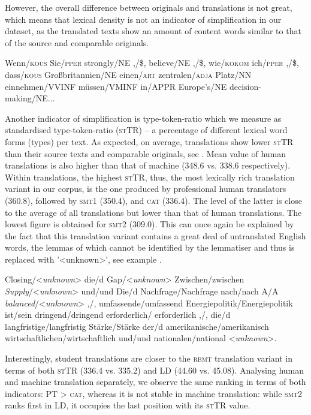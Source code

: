 \documentclass[output=paper]{LSP/langsci}
\begin{document}
However, the overall difference between originals and translations is not great, which means that lexical density is not an indicator of simplification in our dataset, as the translated texts show an amount of content words similar to that of the source and comparable originals.

\ea \label{ex:4:1}
Wenn/\textsc{kous} Sie/\textsc{pper} strongly/NE ,/\$, believe/NE ,/\$, wie/\textsc{kokom} ich/\textsc{pper} ,/\$, dass/\textsc{kous} Großbritannien/NE einen/\textsc{art} zentralen/\textsc{adja} Platz/NN einnehmen/VVINF müssen/VMINF in/APPR Europe’s/NE decision-making/NE...
\z

Another indicator of simplification is type-token-ratio which we measure as standardised type-token-ratio (\textsc{st}TR) – a percentage of different lexical word forms (types) per text.  As expected, on average, translations show lower \textsc{st}TR than their source texts and comparable originals, see . Mean value of human translations is also higher than that of machine (348.6 vs. 338.6 respectively). Within translations, the highest \textsc{st}TR, thus, the most lexically rich translation variant in our corpus, is the one produced by professional human translators (360.8), followed by \textsc{smt}1 (350.4), and \textsc{cat} (336.4).  The level of the latter is close to the average of all translations but lower than that of human translations. The lowest figure is obtained for \textsc{smt}2 (309.0). This can once again be explained by the fact that this translation variant contains a great deal of untranslated English words, the lemmas of which cannot be identified by the lemmatiser and thus is replaced with '<unknown>’, see example .

\ea \label{ex:4:2}
Closing/<\textit{unknown}> die/d Gap/<\textit{unknown}> Zwischen/zwischen \textit{Supply}/<\textit{unknown}> und/und Die/d Nachfrage/Nachfrage nach/nach A/A \textit{balanced}/<\textit{unknown}> ,/, umfassende/umfassend Energiepolitik/Energiepolitik ist/sein dringend/dringend erforderlich/  erforderlich ,/, die/d langfristige/langfristig Stärke/Stärke der/d  amerikanische/amerikanisch wirtschaftlichen/wirtschaftlich und/und nationalen/national <\textit{unknown}>.
\z

Interestingly, student translations are closer to the \textsc{rbmt} translation variant in terms of both \textsc{st}TR (336.4 vs. 335.2) and LD (44.60 vs. 45.08). Analysing human and machine translation separately, we observe the same ranking in terms of both indicators: PT > \textsc{cat}, whereas it is not stable in machine translation: while \textsc{smt}2 ranks first in LD, it occupies the last position with its \textsc{st}TR value.
\end{document}

